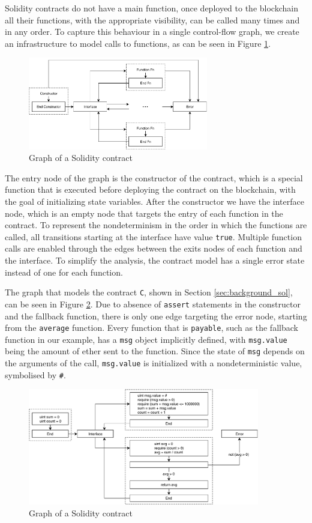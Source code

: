 Solidity contracts do not have a main function, once deployed to the blockchain all their functions, with the appropriate visibility, can be called many times and in any order. To capture this behaviour in a single control-flow graph, we create an infrastructure to model calls to functions, as can be seen in Figure \ref{fig:cfg_contract-general}.

\begin{figure}[ht]
	\centering
	\includegraphics[width=0.7\textwidth]{images/contract-general}
	\caption{Graph of a Solidity contract}
	\label{fig:cfg_contract-general}
\end{figure}

The entry node of the graph is the constructor of the contract, which is a special function that is executed before deploying the contract on the blockchain, with the goal of initializing state variables. After the constructor we have the interface node, which is an empty node that targets the entry of each function in the contract. To represent the nondeterminism in the order in which the functions are called, all transitions starting at the interface have value \texttt{true}. Multiple function calls are enabled through the edges between the exits nodes of each function and the interface. To simplify the analysis, the contract model has a single error state instead of one for each function. 

The graph that models the contract \texttt{C}, shown in Section \ref{sec:background_sol}, can be seen in Figure \ref{fig:cfg_contract-c}. Due to absence of \texttt{assert} statements in the constructor and the fallback function, there is only one edge targeting the error node, starting from the \texttt{average} function. Every function that is \texttt{payable}, such as the fallback function in our example, has a \texttt{msg} object implicitly defined, with \texttt{msg.value} being the amount of ether sent to the function. Since the state of \texttt{msg} depends on the arguments of the call, \texttt{msg.value} is initialized with a nondeterministic value, symbolised by \texttt{\#}.

\begin{figure}[ht]
	\centering
	\includegraphics[width=0.9\textwidth]{images/contract-c}
	\caption{Graph of a Solidity contract}
	\label{fig:cfg_contract-c}
\end{figure}
